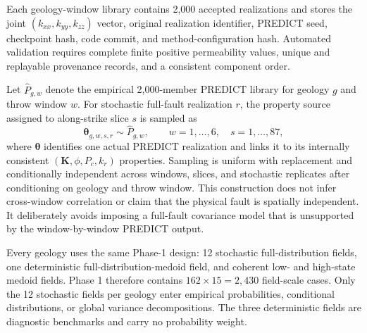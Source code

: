 
\label{sec:si-full-fault-sampling}


Each geology-window library contains 2,000 accepted realizations and stores the
joint $(k_{xx},k_{yy},k_{zz})$ vector, original realization identifier,
PREDICT seed, checkpoint hash, code commit, and method-configuration hash.
Automated validation requires complete finite positive permeability values,
unique and replayable provenance records, and a consistent component order.


Let $\widehat P_{g,w}$ denote the empirical 2,000-member PREDICT library for
geology $g$ and throw window $w$. For stochastic full-fault realization $r$,
the property source assigned to along-strike slice $s$ is sampled as
\begin{equation}
  \boldsymbol{\theta}_{g,w,s,r}
  \sim \widehat P_{g,w},
  \qquad w=1,\ldots,6,\quad s=1,\ldots,87,
  \label{eq:si-conditional-full-fault-sampling}
\end{equation}
where $\boldsymbol{\theta}$ identifies one actual PREDICT realization and
links it to its internally consistent
$(\mathbf{K},\phi,P_c,k_r)$ properties. Sampling is uniform with replacement
and conditionally independent across windows, slices, and stochastic
replicates after conditioning on geology and throw window. This construction
does not infer cross-window correlation or claim that the physical fault is
spatially independent. It deliberately avoids imposing a full-fault
covariance model that is unsupported by the window-by-window PREDICT output.

Every geology uses the same Phase-1 design: 12 stochastic full-distribution
fields, one deterministic full-distribution-medoid field, and coherent low-
and high-state medoid fields. Phase 1 therefore contains
$162\times15=2{,}430$ field-scale cases. Only the 12 stochastic fields per
geology enter empirical probabilities, conditional distributions, or global
variance decompositions. The three deterministic fields are diagnostic
benchmarks and carry no probability weight.



